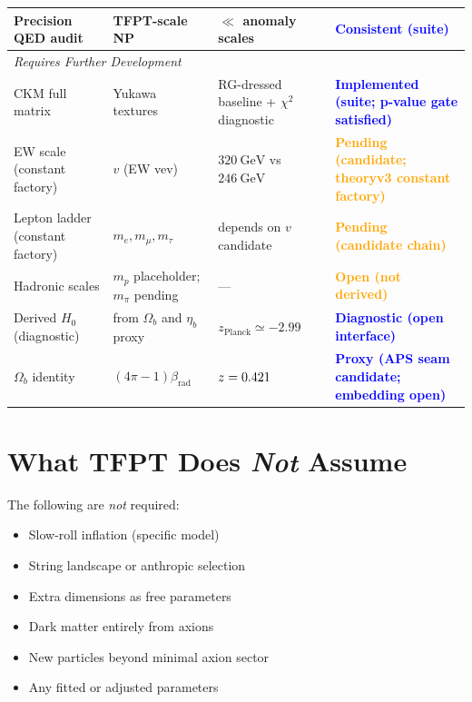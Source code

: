 \begin{longtable}{@{}p{3cm}p{4cm}p{3cm}p{5.2cm}@{}}
\quad Precision QED audit & TFPT-scale NP & $\ll$ anomaly scales & \textcolor{blue}{\textbf{Consistent (suite)}}\\
\midrule
\multicolumn{4}{l}{\textit{Requires Further Development}}\\
\quad CKM full matrix & Yukawa textures & RG-dressed baseline + $\chi^2$ diagnostic & \textcolor{blue}{\textbf{Implemented (suite; p-value gate satisfied)}}\\
\quad EW scale (constant factory) & $v$ (EW vev) & $320~\mathrm{GeV}$ vs $246~\mathrm{GeV}$ & \textcolor{orange}{\textbf{Pending (candidate; theoryv3 constant factory)}}\\
\quad Lepton ladder (constant factory) & $m_e, m_\mu, m_\tau$ & depends on $v$ candidate & \textcolor{orange}{\textbf{Pending (candidate chain)}}\\
\quad Hadronic scales & $m_p$ placeholder; $m_\pi$ pending & --- & \textcolor{orange}{\textbf{Open (not derived)}}\\
\quad Derived $H_0$ (diagnostic) & from $\Omega_b$ and $\eta_b$ proxy & $z_{\mathrm{Planck}}\simeq -2.99$ & \textcolor{blue}{\textbf{Diagnostic (open interface)}}\\
\quad $\Omega_b$ identity & $(4\pi-1)\beta_{\text{rad}}$ & $z=\num[round-mode=places,round-precision=3]{\TFPTOmegaBZ}$ & \textcolor{blue}{\textbf{Proxy (APS seam candidate; embedding open)}}\\
\end{longtable}
\endgroup

\section{What TFPT Does \emph{Not} Assume}

The following are \emph{not} required:
\begin{itemize}[leftmargin=2em]
    \item[\ding{55}] Slow-roll inflation (specific model)
    \item[\ding{55}] String landscape or anthropic selection
    \item[\ding{55}] Extra dimensions as free parameters
    \item[\ding{55}] Dark matter entirely from axions
    \item[\ding{55}] New particles beyond minimal axion sector
    \item[\ding{55}] Any fitted or adjusted parameters
\end{itemize}

